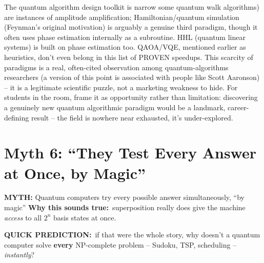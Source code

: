 \documentclass[aspectratio=169,11pt]{beamer}
\newcommand{\myth}[1]{\textbf{\alert{MYTH:}} #1}
\newcommand{\predictlabel}{\textbf{\textcolor{qAmber!80!black}{QUICK PREDICTION:}}}
\newcommand{\soundstruelabel}{\textbf{\textcolor{qViolet}{Why this sounds true:}}}
\begin{document}
\begin{frame}{The quantum algorithm design toolkit is narrow}
{    some quantum walk algorithms) are instances of amplitude amplification;
    Hamiltonian/quantum simulation (Feynman's original motivation) is
    arguably a genuine third paradigm, though it often uses phase
    estimation internally as a subroutine. HHL (quantum linear systems) is
    built on phase estimation too. QAOA/VQE, mentioned earlier as
    heuristics, don't even belong in this list of PROVEN speedups. This
    scarcity of paradigms is a real, often-cited observation among
    quantum-algorithms researchers (a version of this point is associated
    with people like Scott Aaronson) -- it is a legitimate scientific
    puzzle, not a marketing weakness to hide. For students in the room,
    frame it as opportunity rather than limitation: discovering a genuinely
    new quantum algorithmic paradigm would be a landmark, career-defining
    result -- the field is nowhere near exhausted, it's under-explored.
  }
\end{frame}

\section{Myth 6: ``They Test Every Answer at Once, by Magic''}

\begin{frame}{\myth{Quantum computers try every possible answer simultaneously, ``by magic''}}
  \soundstruelabel\ superposition really does give the machine
  \emph{access} to all $2^n$ basis states at once.

  \vspace{3mm}
  \predictlabel\ if that were the whole story, why doesn't a quantum
  computer solve \textbf{every} NP-complete problem -- Sudoku, TSP,
  scheduling -- \emph{instantly}?

\end{frame}
\end{document}
